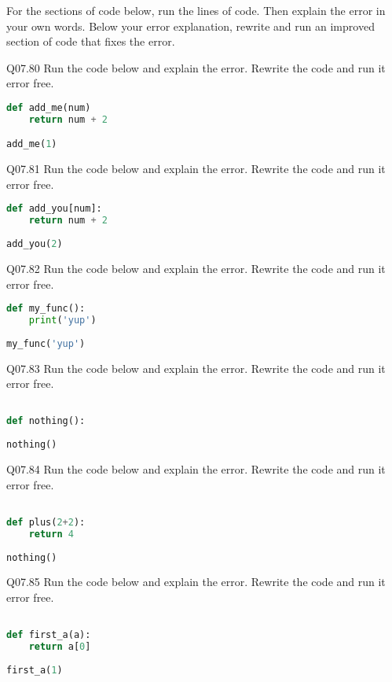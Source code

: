 \documentclass{book}
\begin{document}
For the sections of code below, run the lines of code. Then explain the
error in your own words. Below your error explanation, rewrite and run
an improved section of code that fixes the error.

Q07.80 Run the code below and explain the error. Rewrite the code and
run it error free.

\begin{lstlisting}[language=Python]
def add_me(num)
    return num + 2

add_me(1)
\end{lstlisting}

Q07.81 Run the code below and explain the error. Rewrite the code and
run it error free.

\begin{lstlisting}[language=Python]
def add_you[num]:
    return num + 2
    
add_you(2)
\end{lstlisting}

Q07.82 Run the code below and explain the error. Rewrite the code and
run it error free.

\begin{lstlisting}[language=Python]
def my_func():
    print('yup')
    
my_func('yup')
\end{lstlisting}

Q07.83 Run the code below and explain the error. Rewrite the code and
run it error free.

\begin{lstlisting}[language=Python]

def nothing():
    
nothing()
\end{lstlisting}

Q07.84 Run the code below and explain the error. Rewrite the code and
run it error free.

\begin{lstlisting}[language=Python]

def plus(2+2):
    return 4 
    
nothing()
\end{lstlisting}

Q07.85 Run the code below and explain the error. Rewrite the code and
run it error free.

\begin{lstlisting}[language=Python]

def first_a(a):
    return a[0]
    
first_a(1)
\end{lstlisting}
    
\end{document}
